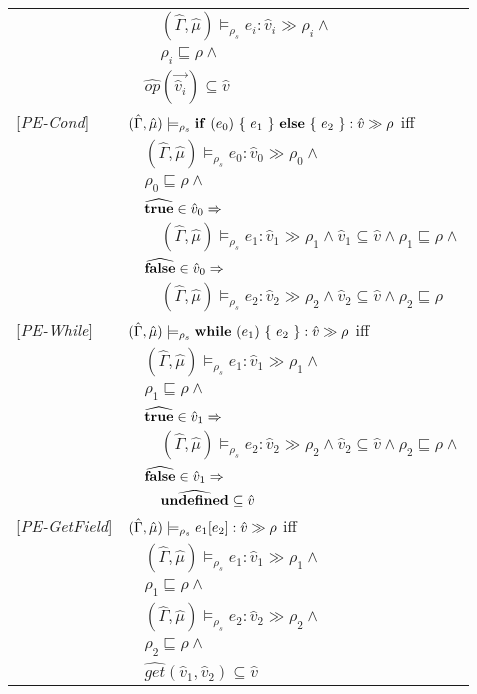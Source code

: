 \documentclass[[12pt,a4paper,twoside,openrigh]{article}
\newcommand{\vat}[0]{\hat{v}}
\newcommand{\muat}[0]{\hat{\mu}}
\newcommand{\Env}[0]{\hat{\Gamma}}
\newcommand{\modelrho}{\models_{\rho_s}}
\newcommand{\aenvs}{(\Env,\muat)}
\newcommand{\caesti}[2]{\aenvs \modelrho #1 : \vat_{#2} \gg \rho_{#2}}
\newcommand{\caest}[1]{\aenvs \modelrho #1 : \vat \gg \rho}
\begin{document}
\begin{tabular}{l l l l}
&&&$\caesti {e_i} {i} \wedge $\\
&&&$\rho_i \sqsubseteq \rho \wedge$\\
&&\multicolumn{2}{l}{$\widehat{op} (\vec{\vat_i}) \subseteq \vat $}\\
{[\textit{PE-Cond}]}&\multicolumn{3}{l}{$\caest {\cond {e_0} {e_1} {e_2}} $ iff}\\
&&\multicolumn{2}{l}{$\caesti {e_0} {0} \wedge$}\\
&&\multicolumn{2}{l}{$\rho_0 \sqsubseteq \rho \wedge$} \\
&&\multicolumn{2}{l}{$\widehat{\true} \in \vat_0 \Rightarrow$}\\
&&&$\caesti {e_1} {1} \wedge \vat_1 \subseteq \vat \wedge \rho_1 \sqsubseteq \rho \wedge$ \\
&&\multicolumn{2}{l}{$\widehat{\false} \in \vat_0 \Rightarrow$}\\
&&&$\caesti {e_2} {2} \wedge \vat_2 \subseteq \vat \wedge \rho_2 \sqsubseteq \rho$ \\
{[\textit{PE-While}]}&\multicolumn{3}{l}{$\caest {\while {e_1} {e_2}} $ iff}\\
&&\multicolumn{2}{l}{$\caesti {e_1} {1} \wedge $}\\
&&\multicolumn{2}{l}{$\rho_1 \sqsubseteq \rho \wedge$} \\
&&\multicolumn{2}{l}{$\widehat{\true} \in \vat_1 \Rightarrow$}\\
&&&$\caesti {e_2} {2} \wedge \vat_2 \subseteq \vat \wedge \rho_2 \sqsubseteq \rho \wedge$\\
&&\multicolumn{2}{l}{$\widehat{\false} \in \vat_1 \Rightarrow$}\\
&&&$\widehat{\undef} \subseteq \vat$\\
{[\textit{PE-GetField}]}&\multicolumn{3}{l}{$\caest {\lookup {e_1} {e_2}} $ iff}\\
&&\multicolumn{2}{l}{$ \caesti {e_1} {1} \wedge $}\\
&&\multicolumn{2}{l}{$\rho_1 \sqsubseteq \rho \wedge$} \\
&&\multicolumn{2}{l}{$ \caesti {e_2} {2} \wedge $} \\
&&\multicolumn{2}{l}{$\rho_2 \sqsubseteq \rho \wedge$} \\
&&\multicolumn{2}{l}{$\widehat{get} (\vat_1, \vat_2) \subseteq \vat$} \\
\end{tabular}\newpage
\end{document}

